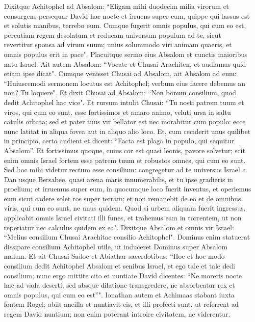 \begin{biblechapter}  
\verse Dixitque Achitophel ad Absalom: “Eligam mihi duodecim milia virorum et consurgens persequar David hac nocte 
\verse et irruens super eum, quippe qui lassus est et solutis manibus, terrebo eum. Cumque fugerit omnis populus, qui cum eo est, percutiam regem desolatum 
\verse et reducam universum populum ad te, sicut revertitur sponsa ad virum suum; unius solummodo viri animam quaeris, et omnis populus erit in pace". 
\verse Placuitque sermo eius Absalom et cunctis maioribus natu Israel. 
\verse Ait autem Absalom: “Vocate et Chusai Arachiten, et audiamus quid etiam ipse dicat". 
\verse Cumque venisset Chusai ad Absalom, ait Absalom ad eum: “Huiuscemodi sermonem locutus est Achitophel; verbum eius facere debemus an non? Tu loquere". 
\verse Et dixit Chusai ad Absalom: “Non bonum consilium, quod dedit Achitophel hac vice". 
\verse Et rursum intulit Chusai: “Tu nosti patrem tuum et viros, qui cum eo sunt, esse fortissimos et amaro animo, veluti ursa in saltu catulis orbata; sed et pater tuus vir bellator est nec morabitur cum populo: 
\verse ecce nunc latitat in aliqua fovea aut in aliquo alio loco. Et, cum ceciderit unus quilibet in principio, certo audient et dicent: “Facta est plaga in populo, qui sequitur Absalom”. 
\verse Et fortissimus quoque, cuius cor est quasi leonis, pavore solvetur; scit enim omnis Israel fortem esse patrem tuum et robustos omnes, qui cum eo sunt. 
\verse Sed hoc mihi videtur rectum esse consilium: congregetur ad te universus Israel a Dan usque Bersabee, quasi arena maris innumerabilis, et tu ipse gradieris in proelium; 
\verse et irruemus super eum, in quocumque loco fuerit inventus, et operiemus eum sicut cadere solet ros super terram; et non remanebit de eo et de omnibus viris, qui cum eo sunt, ne unus quidem. 
\verse Quod si urbem aliquam fuerit ingressus, applicabit omnis Israel civitati illi funes, et trahemus eam in torrentem, ut non reperiatur nec calculus quidem ex ea". 
\verse Dixitque Absalom et omnis vir Israel: “Melius consilium Chusai Arachitae consilio Achitophel". Dominus enim statuerat dissipare consilium Achitophel utile, ut induceret Dominus super Absalom malum. 
\verse Et ait Chusai Sadoc et Abiathar sacerdotibus: “Hoc et hoc modo consilium dedit Achitophel Absalom et senibus Israel, et ego tale et tale dedi consilium; 
\verse nunc ergo mittite cito et nuntiate David dicentes: “Ne moreris nocte hac ad vada deserti, sed absque dilatione transgredere, ne absorbeatur rex et omnis populus, qui cum eo est”". 
\verse Ionathan autem et Achimaas stabant iuxta fontem Rogel; abiit ancilla et nuntiavit eis, et illi profecti sunt, ut referrent ad regem David nuntium; non enim poterant introire civitatem, ne viderentur. 

\end{biblechapter}
